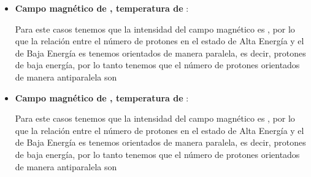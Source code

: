 \begin{itemize}
  \item \textbf{Campo magnético de , temperatura de }:
  
Para este casos tenemos que la intensidad del campo magnético es , por lo que la relación entre el número de protones en el estado de Alta Energía y el de Baja Energía es
tenemos  orientados de manera paralela, es decir,  protones de baja energía, por lo tanto tenemos que el número de protones orientados de manera antiparalela son



  \item \textbf{Campo magnético de , temperatura de }:
  

  Para este casos tenemos que la intensidad del campo magnético es , por lo que la relación entre el número de protones en el estado de Alta Energía y el de Baja Energía es
  tenemos  orientados de manera paralela, es decir,  protones de baja energía, por lo tanto tenemos que el número de protones orientados de manera antiparalela son


\end{itemize}
